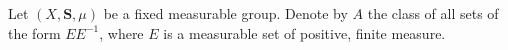 Let $(X, \mathbf{S}, \mu)$ be a fixed measurable group. Denote by $A$ the class of all sets of the form $EE^{-1}$, where $E$ is a measurable set of positive, finite measure.

